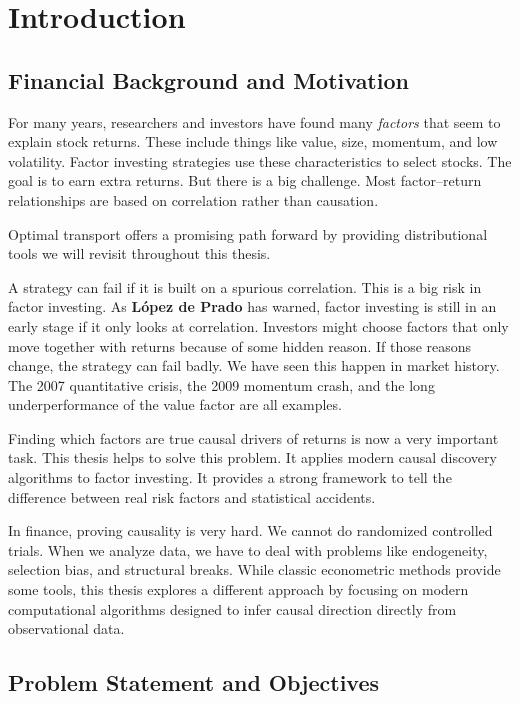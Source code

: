 \chapter{Introduction}

\section{Financial Background and Motivation}

For many years, researchers and investors have found many \emph{factors} that seem to explain stock returns. These include things like value, size, momentum, and low volatility. Factor investing strategies use these characteristics to select stocks. The goal is to earn extra returns. But there is a big challenge. Most factor–return relationships are based on correlation rather than causation.

Optimal transport offers a promising path forward by providing distributional tools we will revisit throughout this thesis.

A strategy can fail if it is built on a spurious correlation. This is a big risk in factor investing. As \textbf{López de Prado} has warned, factor investing is still in an early stage if it only looks at correlation\cite{Lopez23}. Investors might choose factors that only move together with returns because of some hidden reason. If those reasons change, the strategy can fail badly. We have seen this happen in market history. The 2007 quantitative crisis, the 2009 momentum crash, and the long underperformance of the value factor are all examples.

Finding which factors are true causal drivers of returns is now a very important task. This thesis helps to solve this problem. It applies modern causal discovery algorithms to factor investing. It provides a strong framework to tell the difference between real risk factors and statistical accidents.

In finance, proving causality is very hard. We cannot do randomized controlled trials. When we analyze data, we have to deal with problems like endogeneity, selection bias, and structural breaks. While classic econometric methods provide some tools, this thesis explores a different approach by focusing on modern computational algorithms designed to infer causal direction directly from observational data.

\section{Problem Statement and Objectives}

